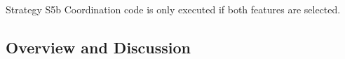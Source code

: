 \begin{frame}{\myframetitle}
	\begin{fancycolumns}[widths={30},animation=none]
		\begin{definition}{Strategy S5b}
			Coordination code is only executed if both features are selected.
		\end{definition}
		\nextcolumn
	\end{fancycolumns}
\end{frame}

%

%
%
%

\subsection{Overview and Discussion}

\begin{frame}[label=HandlingFeatureInteractions]{\myframetitle}
	\centering
\end{frame}
